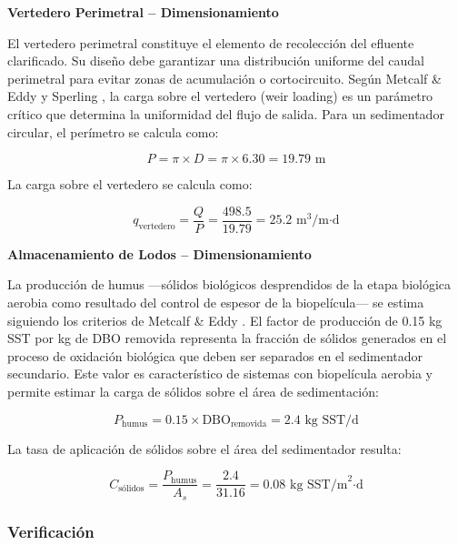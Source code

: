 \documentclass[12pt,a4paper]{article}
\begin{document}
\textbf{Vertedero Perimetral -- Dimensionamiento}

El vertedero perimetral constituye el elemento de recolección del efluente clarificado. Su diseño debe garantizar una distribución uniforme del caudal perimetral para evitar zonas de acumulación o cortocircuito. Según Metcalf \& Eddy \cite{metcalf2014} y Sperling \cite{sperling2007}, la carga sobre el vertedero (weir loading) es un parámetro crítico que determina la uniformidad del flujo de salida. Para un sedimentador circular, el perímetro se calcula como:

\begin{equation}
P = \pi \times D = \pi \times 6.30 = 19.79 \text{ m}
\end{equation}

La carga sobre el vertedero se calcula como:

\begin{equation}
q_{\text{vertedero}} = \frac{Q}{P} = \frac{498.5}{19.79} = 25.2 \text{ m}^3\text{/m·d}
\end{equation}

\textbf{Almacenamiento de Lodos -- Dimensionamiento}

La producción de humus —sólidos biológicos desprendidos de la etapa biológica aerobia como resultado del control de espesor de la biopelícula— se estima siguiendo los criterios de Metcalf \& Eddy \cite{metcalf2014}. El factor de producción de 0.15 kg SST por kg de DBO removida representa la fracción de sólidos generados en el proceso de oxidación biológica que deben ser separados en el sedimentador secundario. Este valor es característico de sistemas con biopelícula aerobia y permite estimar la carga de sólidos sobre el área de sedimentación:

\begin{equation}
P_{\text{humus}} = 0.15 \times \text{DBO}_{\text{removida}} = 2.4 \text{ kg SST/d}
\end{equation}

La tasa de aplicación de sólidos sobre el área del sedimentador resulta:

\begin{equation}
C_{\text{sólidos}} = \frac{P_{\text{humus}}}{A_s} = \frac{2.4}{31.16} = 0.08 \text{ kg SST/m}^2\text{·d}
\end{equation}

\subsubsection{Verificación}
\end{document}
